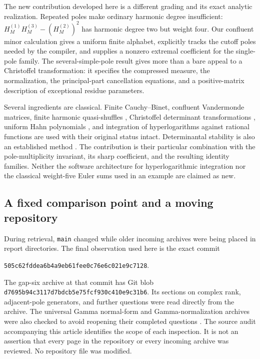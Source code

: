 \documentclass[11pt,letterpaper]{article}
\numberwithin{equation}{section}
\theoremstyle{definition}\newtheorem{definition}[theorem]{Definition}
\theoremstyle{remark}\newtheorem{remark}[theorem]{Remark}
\newcommand{\src}[1]{\nolinkurl{#1}}
\newcommand{\snapshot}{505c62fddea6b4a9eb61fee0c76e6c021e9c7128}
\begin{document}
The new contribution developed here is a different grading and its exact
analytic realization. Repeated poles make ordinary harmonic degree
insufficient: $H_M^{(1)}H_M^{(3)}-(H_M^{(2)})^2$ has harmonic degree two
but weight four. Our confluent minor calculation gives a uniform finite
alphabet, explicitly tracks the cutoff poles needed by the compiler,
and supplies a nonzero extremal coefficient for the single-pole family.
The several-simple-pole result gives more than a bare appeal to a
Christoffel transformation: it specifies the compressed measure, the
normalization, the principal-part cancellation equations, and a
positive-matrix description of exceptional residue parameters.

Several ingredients are classical. Finite Cauchy--Binet, confluent
Vandermonde matrices, finite harmonic quasi-shuffles \cite{hoffman},
Christoffel determinant transformations \cite{krattenthaler}, uniform
Hahn polynomials \cite{dlmf-hahn}, and integration of hyperlogarithms
against rational functions \cite{panzer} are used with their original
status intact. Determinantal stability is also an established method
\cite{borcea}. The contribution is their particular combination with
the pole-multiplicity invariant, its sharp coefficient, and the
resulting identity families. Neither the software architecture for
hyperlogarithmic integration nor the classical weight-five Euler sums
used in an example are claimed as new.

\subsection{A fixed comparison point and a moving repository}

During retrieval, \texttt{main} changed while older incoming archives
were being placed in report directories. The final observation used here
is the exact commit
\begin{center}\small\texttt{\snapshot}.\end{center}
The gap-six archive at that commit has Git blob
\src{d7695b94c3117d7bdcb5e75fcf930c410e9c31b6}.
Its sections on complex rank, adjacent-pole generators, and further
questions were read directly from the archive. The universal Gamma
normal-form and Gamma-normalization archives were also checked to avoid
reopening their completed questions \cite{universal,normalizations}.
The source audit accompanying this article identifies the scope of each
inspection. It is not an assertion that every page in the repository
or every incoming archive was reviewed. No repository file was modified.
\end{document}
